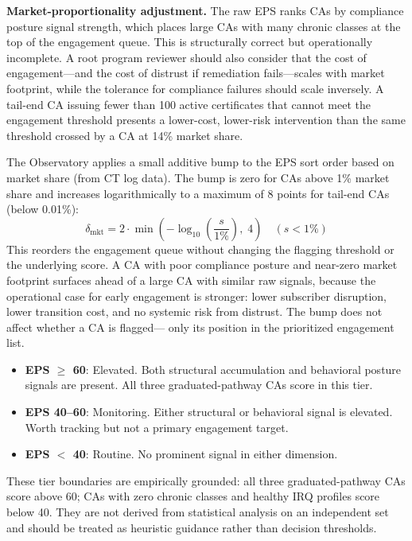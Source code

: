 \documentclass[10pt,twocolumn,letterpaper]{article}
\begin{document}
\textbf{Market-proportionality adjustment.} The raw EPS ranks CAs by compliance posture
signal strength, which places large CAs with many chronic classes at the top of the
engagement queue. This is structurally correct but operationally incomplete. A root
program reviewer should also consider that the cost of engagement---and the cost of
distrust if remediation fails---scales with market footprint, while the tolerance for
compliance failures should scale inversely. A tail-end CA issuing fewer than 100 active
certificates that cannot meet the engagement threshold presents a lower-cost, lower-risk
intervention than the same threshold crossed by a CA at 14\% market share.

The Observatory applies a small additive bump to the EPS sort order based on market
share (from CT log data). The bump is zero for CAs above 1\% market share and
increases logarithmically to a maximum of 8 points for tail-end CAs (below 0.01\%):
\[
\delta_{\text{mkt}} = 2 \cdot \min\!\left(-\log_{10}\!\left(\frac{s}{1\%}\right),\; 4\right) \quad (s < 1\%)
\]
This reorders the engagement queue without changing the flagging threshold or the
underlying score. A CA with poor compliance posture and near-zero market footprint
surfaces ahead of a large CA with similar raw signals, because the operational case
for early engagement is stronger: lower subscriber disruption, lower transition cost,
and no systemic risk from distrust. The bump does not affect whether a CA is flagged---
only its position in the prioritized engagement list.

\begin{itemize}[noitemsep,topsep=2pt]
\item \textbf{EPS $\geq$ 60}: Elevated. Both structural accumulation and behavioral
  posture signals are present. All three graduated-pathway CAs score in this tier.
\item \textbf{EPS 40--60}: Monitoring. Either structural or behavioral signal is
  elevated. Worth tracking but not a primary engagement target.
\item \textbf{EPS $<$ 40}: Routine. No prominent signal in either dimension.
\end{itemize}

These tier boundaries are empirically grounded: all three graduated-pathway CAs score
above 60; CAs with zero chronic classes and healthy IRQ profiles score below 40. They are
not derived from statistical analysis on an independent set and should be treated as
heuristic guidance rather than decision thresholds.
\end{document}
